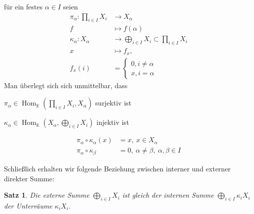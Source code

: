 \documentclass[12pt,a4paper]{article}
\newtheorem{theorem}{Satz}
\theoremstyle{definition}
\theoremstyle{remark}
\DeclareMathOperator{\Hom}{Hom}
\begin{document}
	für ein festes $\alpha \in I$ seien
	\begin{equation}
		\begin{split}
			\pi_{\alpha}: \prod_{i \in I} X_i &\rightarrow X_{\alpha} \\
			f &\mapsto f(\alpha) \\
			\kappa_{\alpha}: X_{\alpha} &\rightarrow \bigoplus_{i \in I} X_i \subset \prod_{i \in I} X_i \\
			x &\mapsto f_x, \\
			f_x(i) &= \begin{cases}
					0, i \neq \alpha \\
					x, i = \alpha
			\end{cases}
		\end{split}
	\end{equation}
	Man überlegt sich sich unmittelbar, dass 
	\begin{proofenum}	
		\item $\pi_{\alpha} \in \Hom_{\mathbb{K}}(\prod_{i \in I}X_i, X_{\alpha})$ surjektiv ist
		\item $\kappa_{\alpha} \in \Hom_{\mathbb{K}}(X_{\alpha}, \bigoplus_{i \in I} X_i)$ injektiv ist
		\item 
			\begin{equation}
				\begin{split}
				\pi_{\alpha} \circ \kappa_{\alpha}(x) &= x, \ x \in X_{\alpha} \\
				\pi_{\alpha} \circ \kappa_{\beta} &= 0, \ \alpha \neq \beta, \ \alpha, \beta \in I
				\end{split}
			\end{equation}
	\end{proofenum}
	Schließlich erhalten wir folgende Beziehung zwischen interner und externer direkter Summe:
	\begin{theorem}
		Die externe Summe $\bigoplus_{i \in I} X_i$ ist gleich der internen Summe $\bigoplus_{i \in I} \kappa_i X_i$ der Unterräume $\kappa_i X_i$.
	\end{theorem}
\end{document}
